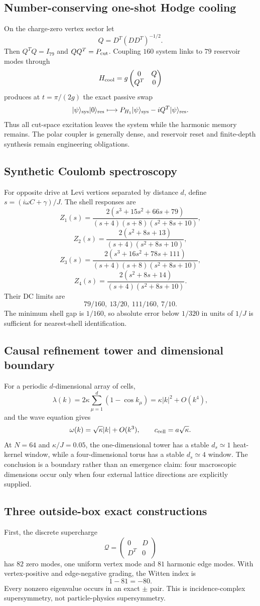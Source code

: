 \subsection{Number-conserving one-shot Hodge cooling}
On the charge-zero vertex sector let
\[
 Q=D^T(DD^T)^{-1/2}.
\]
Then $Q^TQ=I_{79}$ and $QQ^T=P_{\rm cut}$.  Coupling $160$ system links to $79$ reservoir modes through
\[
 H_{\rm cool}=g\begin{pmatrix}0&Q\\Q^T&0\end{pmatrix}
\]
produces at $t=\pi/(2g)$ the exact passive swap
\[
 |\psi\rangle_{\rm sys}|0\rangle_{\rm res}
 \longmapsto
 P_{H_1}|\psi\rangle_{\rm sys}-iQ^T|\psi\rangle_{\rm res}.
\]
Thus all cut-space excitation leaves the system while the harmonic memory remains.  The polar coupler is generally dense, and reservoir reset and finite-depth synthesis remain engineering obligations.

\subsection{Synthetic Coulomb spectroscopy}
For opposite drive at Levi vertices separated by distance $d$, define $s=(i\omega C+\gamma)/J$.  The shell responses are
\[
 Z_1(s)=\frac{2(s^3+15s^2+66s+79)}{(s+4)(s+8)(s^2+8s+10)},
\]
\[
 Z_2(s)=\frac{2(s^2+8s+13)}{(s+4)(s^2+8s+10)},
\]
\[
 Z_3(s)=\frac{2(s^3+16s^2+78s+111)}{(s+4)(s+8)(s^2+8s+10)},
\]
\[
 Z_4(s)=\frac{2(s^2+8s+14)}{(s+4)(s^2+8s+10)}.
\]
Their DC limits are
\[
 \boxed{79/160,\ 13/20,\ 111/160,\ 7/10}.
\]
The minimum shell gap is $1/160$, so absolute error below $1/320$ in units of $1/J$ is sufficient for nearest-shell identification.

\subsection{Causal refinement tower and dimensional boundary}
For a periodic $d$-dimensional array of cells,
\[
 \lambda(k)=2\kappa\sum_{\mu=1}^{d}(1-\cos k_\mu)
 =\kappa|k|^2+O(k^4),
\]
and the wave equation gives
\[
 \omega(k)=\sqrt\kappa|k|+O(k^3),\qquad c_{\rm cell}=a\sqrt\kappa.
\]
At $N=64$ and $\kappa/J=0.05$, the one-dimensional tower has a stable $d_s\simeq1$ heat-kernel window, while a four-dimensional torus has a stable $d_s\simeq4$ window.  The conclusion is a boundary rather than an emergence claim: four macroscopic dimensions occur only when four external lattice directions are explicitly supplied.

\subsection{Three outside-box exact constructions}
First, the discrete supercharge
\[
 \mathcal Q=\begin{pmatrix}0&D\\D^T&0\end{pmatrix}
\]
has $82$ zero modes, one uniform vertex mode and $81$ harmonic edge modes.  With vertex-positive and edge-negative grading, the Witten index is
\[
 \boxed{1-81=-80}.
\]
Every nonzero eigenvalue occurs in an exact $\pm$ pair.  This is incidence-complex supersymmetry, not particle-physics supersymmetry.

